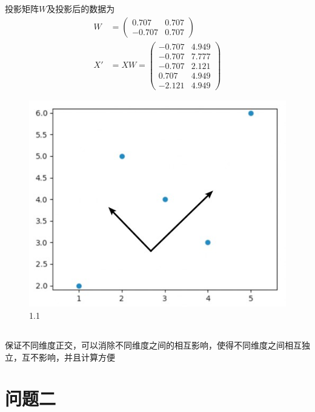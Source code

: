 \documentclass[12pt, a4paper]{article}
\begin{document}
投影矩阵$W$及投影后的数据为
\begin{align*}
    W&=\begin{pmatrix}
        0.707&0.707\\-0.707&0.707
    \end{pmatrix}\\
    X'&=XW=\begin{pmatrix}
        -0.707&4.949\\-0.707&7.777\\-0.707&2.121\\0.707&4.949\\-2.121&4.949
    \end{pmatrix}
\end{align*}

\begin{figure}
    \centering
    \includegraphics*{img/a5_1.jpg}
    \caption{1.1}
\end{figure}

\subsection{}

保证不同维度正交，可以消除不同维度之间的相互影响，使得不同维度之间相互独立，互不影响，并且计算方便


\section{问题二}

\subsection{}
\end{document}
